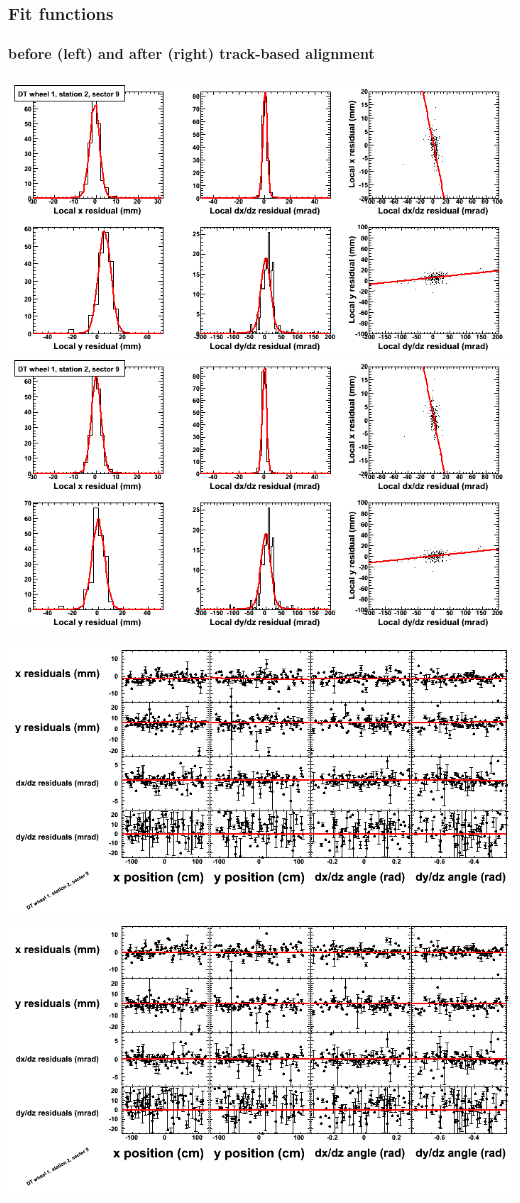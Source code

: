 \documentclass[compress]{beamer}
\begin{document}
\begin{frame}
\frametitle{Fit functions}
\framesubtitle{before (left) and after (right) track-based alignment}
\includegraphics[width=0.5\linewidth]{fitfunctions_re01/MBwhDst2sec09_bellcurves.png} \includegraphics[width=0.5\linewidth]{fitfunctions_re05/MBwhDst2sec09_bellcurves.png}

\includegraphics[width=0.5\linewidth]{fitfunctions_re01/MBwhDst2sec09_polynomials.png} \includegraphics[width=0.5\linewidth]{fitfunctions_re05/MBwhDst2sec09_polynomials.png}
\end{frame}
\end{document}
